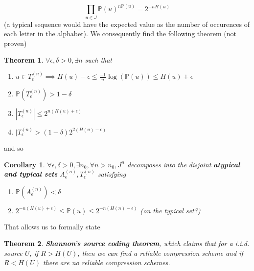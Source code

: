 \documentclass{article}
\newtheorem{corollary}{Corollary}
\newtheorem{theorem}{Theorem}
\theoremstyle{definition}
\begin{document}
\begin{equation}
  \prod_{u \in J} \mathbb{P}(u)^{n \mathbb{P}(u)} = 2^{-n H(u)}
\end{equation}
(a typical sequence would have the expected value as the number of occurences of
each letter in the alphabet). We consequently find the following theorem (not
proven)

\begin{theorem}
  $\forall \epsilon, \delta > 0, \exists n$ such that
  \begin{enumerate}
    \item $u \in T_\epsilon^{(n)} \implies H(u) - \epsilon \leq \frac{-1}{n}
      \log(\mathbb{P}(u)) \leq H(u) + \epsilon$
    \item $\mathbb{P}(T_\epsilon^{(n)}) > 1 - \delta$
    \item $|T_\epsilon^{(n)}| \leq 2^{n(H(u) + \epsilon)}$
    \item $|T_\epsilon^{(n)} > (1 - \delta) 2^{2(H(u) - \epsilon)}$
  \end{enumerate}
\end{theorem}
  
and so

\begin{corollary}
  $\forall \epsilon, \delta > 0, \exists n_0, \forall n > n_0, J^n$ decomposes
  into the disjoint \textbf{atypical and typical sets} $A_\epsilon^{(n)},
  T_\epsilon^{(n)}$ satisfying
  \begin{enumerate}
    \item $\mathbb{P}(A_\epsilon^{(n)}) < \delta$
    \item $2^{-n(H(u) + \epsilon)} \leq \mathbb{P}(u) \leq 2^{-n(H(n) -
        \epsilon)}$ (on the typical set?)
  \end{enumerate}
\end{corollary}

That allows us to formally state

\begin{theorem}
  \textbf{Shannon's source coding theorem}, which claims that for a i.i.d.
  source $U$, if $R > H(U)$, then we can find a reliable compression scheme and
  if $R < H(U)$ there are no reliable compression schemes.
\end{theorem}
\end{document}

